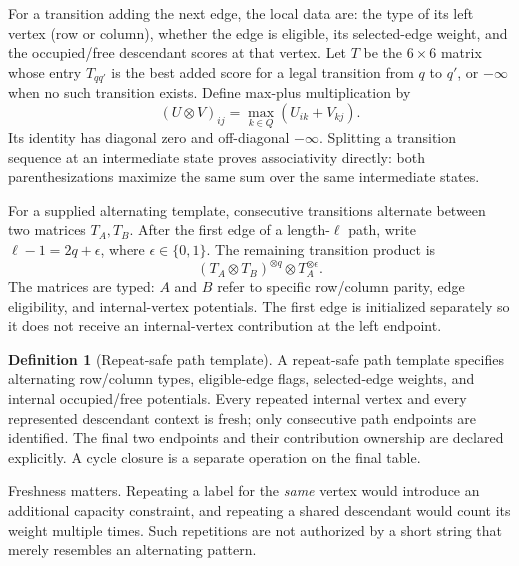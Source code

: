 \documentclass[11pt,letterpaper]{article}
\theoremstyle{definition}
\newtheorem{definition}[definition]{Definition}\aliascntresetthe{definition}
\theoremstyle{remark}
\newcommand{\negInf}{-\infty}
\begin{document}
For a transition adding the next edge, the local data are: the type of its left vertex (row or column), whether the edge is eligible, its selected-edge weight, and the occupied/free descendant scores at that vertex. Let $T$ be the $6\times6$ matrix whose entry $T_{q q'}$ is the best added score for a legal transition from $q$ to $q'$, or $\negInf$ when no such transition exists. Define max-plus multiplication by
\begin{equation}
 (U\otimes V)_{ij}=\max_{k\in Q}(U_{ik}+V_{kj}).
 \label{eq:maxplus}
\end{equation}
Its identity has diagonal zero and off-diagonal $\negInf$. Splitting a transition sequence at an intermediate state proves associativity directly: both parenthesizations maximize the same sum over the same intermediate states.

For a supplied alternating template, consecutive transitions alternate between two matrices $T_A,T_B$. After the first edge of a length-$\ell$ path, write $\ell-1=2q+\epsilon$, where $\epsilon\in\{0,1\}$. The remaining transition product is
\begin{equation}
 (T_A\otimes T_B)^{\otimes q}\otimes T_A^{\otimes\epsilon}.
 \label{eq:periodic}
\end{equation}
The matrices are typed: $A$ and $B$ refer to specific row/column parity, edge eligibility, and internal-vertex potentials. The first edge is initialized separately so it does not receive an internal-vertex contribution at the left endpoint.

\begin{definition}[Repeat-safe path template]
A repeat-safe path template specifies alternating row/column types, eligible-edge flags, selected-edge weights, and internal occupied/free potentials. Every repeated internal vertex and every represented descendant context is fresh; only consecutive path endpoints are identified. The final two endpoints and their contribution ownership are declared explicitly. A cycle closure is a separate operation on the final table.
\end{definition}

Freshness matters. Repeating a label for the \emph{same} vertex would introduce an additional capacity constraint, and repeating a shared descendant would count its weight multiple times. Such repetitions are not authorized by a short string that merely resembles an alternating pattern.
\end{document}
